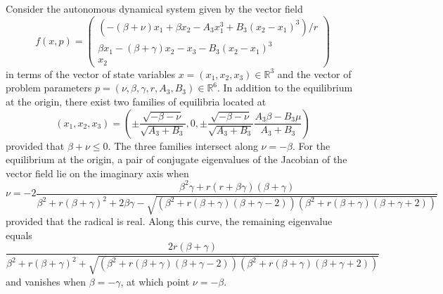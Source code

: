 Consider the autonomous dynamical system given by the vector field
\[
f(x,p)=\left(\begin{array}{c}( -(\beta+\nu)x_1+\beta x_2  - A_3x_1^3 + B_3(x_2-x_1)^3 )/r\\
\beta x_1 - (\beta+\gamma)x_2 - x_3 - B_3(x_2-x_1)^3\\x_2\end{array}\right)
\]
in terms of the vector of state variables $x=(x_1,x_2,x_3)\in\mathbb{R}^3$ and the vector of problem parameters $p=(\nu,\beta,\gamma,r,A_3,B_3)\in\mathbb{R}^6$. In addition to the equilibrium at the origin, there exist two families of equilibria located at
\[
(x_1,x_2,x_3)=\left(\pm\frac{\sqrt{-\beta-\nu}}{\sqrt{A_3+B_3}},0,\pm\frac{\sqrt{-\beta-\nu}}{\sqrt{A_3+B_3}}\frac{A_3\beta-B_3\mu}{A_3+B_3}\right)
\]
provided that $\beta+\nu\le 0$. The three families intersect along $\nu=-\beta$. For the equilibrium at the origin, a pair of conjugate eigenvalues of the Jacobian of the vector field lie on the imaginary axis when
\[
\nu=-2\frac{\beta^2\gamma +r(r+\beta\gamma) (\beta + \gamma) }{\beta^2 +r(\beta+\gamma)^2  + 2\beta \gamma  - 
\sqrt{(\beta^2 + 
    r  (\beta + \gamma)( \beta + \gamma-2)) (\beta^2 + 
    r (\beta + \gamma) ( \beta + \gamma+2))}}
\]
provided that the radical is real. Along this curve, the remaining eigenvalue equals
\[
\frac{2r(\beta+\gamma)}{\beta^2 + 
 r (\beta + \gamma)^2 + \sqrt{(\beta^2 + 
    r  (\beta + \gamma)( \beta + \gamma-2)) (\beta^2 + 
    r (\beta + \gamma) ( \beta + \gamma+2))}}
\]
and vanishes when $\beta=-\gamma$, at which point $\nu=-\beta$.

